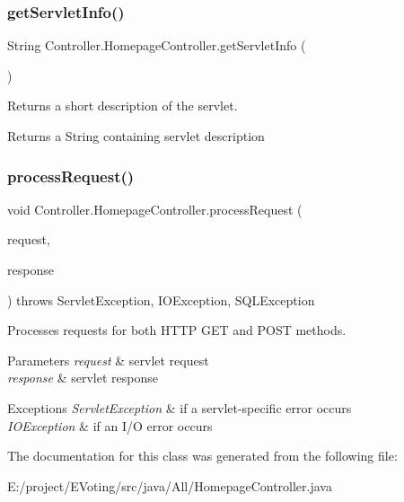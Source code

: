 \subsubsection{\texorpdfstring{getServletInfo()}{getServletInfo()}}
{\footnotesize\ttfamily String Controller.\+Homepage\+Controller.\+get\+Servlet\+Info (\begin{DoxyParamCaption}{ }\end{DoxyParamCaption})}

Returns a short description of the servlet.

\begin{DoxyReturn}{Returns}
a String containing servlet description 
\end{DoxyReturn}
\mbox{\label{class_controller_1_1_homepage_controller_a687e3c77e846d1267d06490228cd00c1}} 
\subsubsection{\texorpdfstring{processRequest()}{processRequest()}}
{\footnotesize\ttfamily void Controller.\+Homepage\+Controller.\+process\+Request (\begin{DoxyParamCaption}\item[{Http\+Servlet\+Request}]{request,  }\item[{Http\+Servlet\+Response}]{response }\end{DoxyParamCaption}) throws Servlet\+Exception, I\+O\+Exception, S\+Q\+L\+Exception\hspace{0.3cm}{\ttfamily [protected]}}

Processes requests for both H\+T\+TP {\ttfamily G\+ET} and {\ttfamily P\+O\+ST} methods.


\begin{DoxyParams}{Parameters}
{\em request} & servlet request \\
\hline
{\em response} & servlet response \\
\hline
\end{DoxyParams}

\begin{DoxyExceptions}{Exceptions}
{\em Servlet\+Exception} & if a servlet-\/specific error occurs \\
\hline
{\em I\+O\+Exception} & if an I/O error occurs \\
\hline
\end{DoxyExceptions}


The documentation for this class was generated from the following file\+:\begin{DoxyCompactItemize}
\item 
E\+:/project/\+E\+Voting/src/java/\+All/Homepage\+Controller.\+java\end{DoxyCompactItemize}
